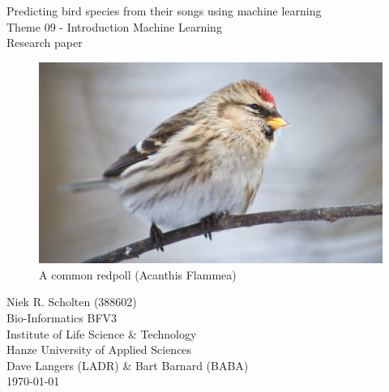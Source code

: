 
\begin{center}

    \Huge{Predicting bird species from their songs using machine learning}\\
    \vspace{\baselineskip}
    \LARGE{Theme 09 - Introduction Machine Learning}\\
    \large{Research paper}\\
    \vspace{\baselineskip}

    \begin{figure}
        \centering\includegraphics[width=\linewidth]{Acanthis_flammea}
        \caption{A common redpoll (Acanthis Flammea)}
        \label{fig:Acanthis_flammea}
    \end{figure}

\end{center}
\vspace{\baselineskip}

\normalsize
\vspace*{\fill}
\begin{flushright}
    Niek R. Scholten (388602)\\
    Bio-Informatics BFV3\\
    Institute of Life Science \& Technology\\
    Hanze University of Applied Sciences\\
    Dave Langers (LADR) \& Bart Barnard (BABA)\\
    \today
\end{flushright}
\newpage

\null
\thispagestyle{empty}
\addtocounter{page}{-1}
\newpage

